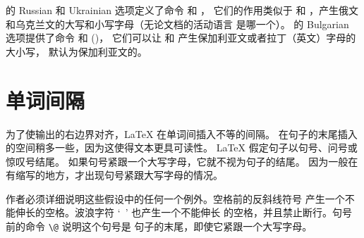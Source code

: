  的 Russian 和 Ukrainian 选项定义了命令  和 ，
它们的作用类似于  和 ，产生俄文和乌克兰文的大写和小写字母（无论文档的活动语言
是哪一个）。 的 Bulgarian 选项提供了命令  和  ()，
它们可以让  和  产生保加利亚文或者拉丁（英文）字母的大小写，
默认为保加利亚文的。


\section{单词间隔}

为了使输出的右边界对齐，\LaTeX{} 在单词间插入不等的间隔。
在句子的末尾插入的空间稍多一些，因为这使得文本更具可读性。
\LaTeX{} 假定句子以句号、问号或惊叹号结尾。
如果句号紧跟一个大写字母，它就不视为句子的结尾。
因为一般在有缩写的地方，才出现句号紧跟大写字母的情况。

作者必须详细说明这些假设中的任何一个例外。空格前的反斜线符号
产生一个不能伸长的空格。波浪字符 `\verb| |' 也产生一个不能伸长
的空格，并且禁止断行。句号前的命令 \verb|\@| 说明这个句号是
句子的末尾，即使它紧跟一个大写字母。 
 


